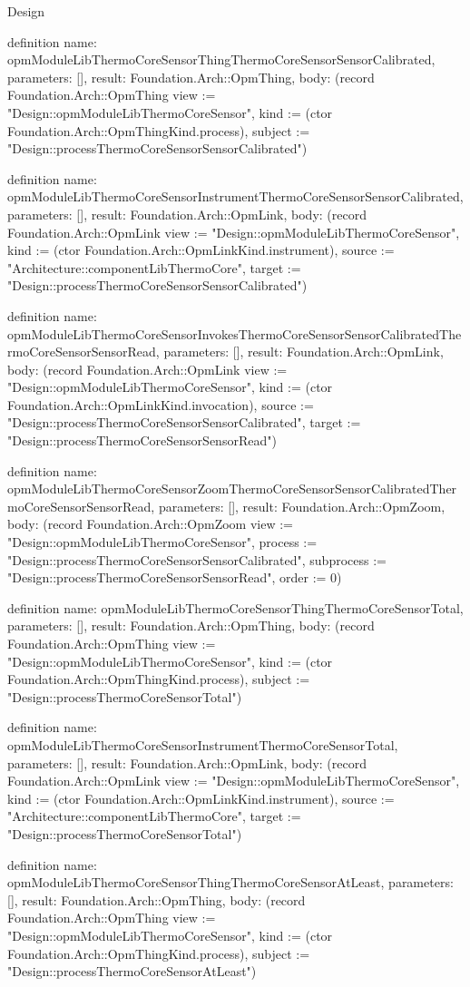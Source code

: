 \begin{lexlean}{Design}
\begin{semanticmodule}
definition{
  name: opmModuleLibThermoCoreSensorThingThermoCoreSensorSensorCalibrated,
  parameters: [],
  result: Foundation.Arch::OpmThing,
  body: (record Foundation.Arch::OpmThing {view := "Design::opmModuleLibThermoCoreSensor", kind := (ctor Foundation.Arch::OpmThingKind.process), subject := "Design::processThermoCoreSensorSensorCalibrated"})
}

definition{
  name: opmModuleLibThermoCoreSensorInstrumentThermoCoreSensorSensorCalibrated,
  parameters: [],
  result: Foundation.Arch::OpmLink,
  body: (record Foundation.Arch::OpmLink {view := "Design::opmModuleLibThermoCoreSensor", kind := (ctor Foundation.Arch::OpmLinkKind.instrument), source := "Architecture::componentLibThermoCore", target := "Design::processThermoCoreSensorSensorCalibrated"})
}

definition{
  name: opmModuleLibThermoCoreSensorInvokesThermoCoreSensorSensorCalibratedThermoCoreSensorSensorRead,
  parameters: [],
  result: Foundation.Arch::OpmLink,
  body: (record Foundation.Arch::OpmLink {view := "Design::opmModuleLibThermoCoreSensor", kind := (ctor Foundation.Arch::OpmLinkKind.invocation), source := "Design::processThermoCoreSensorSensorCalibrated", target := "Design::processThermoCoreSensorSensorRead"})
}

definition{
  name: opmModuleLibThermoCoreSensorZoomThermoCoreSensorSensorCalibratedThermoCoreSensorSensorRead,
  parameters: [],
  result: Foundation.Arch::OpmZoom,
  body: (record Foundation.Arch::OpmZoom {view := "Design::opmModuleLibThermoCoreSensor", process := "Design::processThermoCoreSensorSensorCalibrated", subprocess := "Design::processThermoCoreSensorSensorRead", order := 0})
}

definition{
  name: opmModuleLibThermoCoreSensorThingThermoCoreSensorTotal,
  parameters: [],
  result: Foundation.Arch::OpmThing,
  body: (record Foundation.Arch::OpmThing {view := "Design::opmModuleLibThermoCoreSensor", kind := (ctor Foundation.Arch::OpmThingKind.process), subject := "Design::processThermoCoreSensorTotal"})
}

definition{
  name: opmModuleLibThermoCoreSensorInstrumentThermoCoreSensorTotal,
  parameters: [],
  result: Foundation.Arch::OpmLink,
  body: (record Foundation.Arch::OpmLink {view := "Design::opmModuleLibThermoCoreSensor", kind := (ctor Foundation.Arch::OpmLinkKind.instrument), source := "Architecture::componentLibThermoCore", target := "Design::processThermoCoreSensorTotal"})
}

definition{
  name: opmModuleLibThermoCoreSensorThingThermoCoreSensorAtLeast,
  parameters: [],
  result: Foundation.Arch::OpmThing,
  body: (record Foundation.Arch::OpmThing {view := "Design::opmModuleLibThermoCoreSensor", kind := (ctor Foundation.Arch::OpmThingKind.process), subject := "Design::processThermoCoreSensorAtLeast"})
}


\end{semanticmodule}
\end{lexlean}

